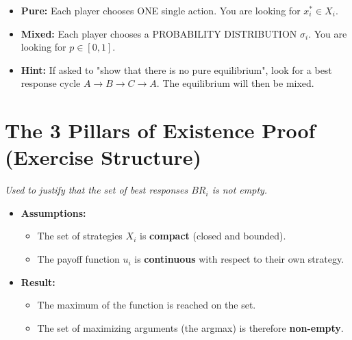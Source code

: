 \documentclass[10pt,a4paper]{article}
\begin{document}
\begin{tcolorbox}[colback=purple!5,title=Distinction: Pure vs Mixed Equilibrium]
\begin{itemize}
    \item \textbf{Pure:} Each player chooses ONE single action. You are looking for $x_i^* \in X_i$.
    \item \textbf{Mixed:} Each player chooses a PROBABILITY DISTRIBUTION $\sigma_i$. You are looking for $p \in [0,1]$.
    \item \textbf{Hint:} If asked to "show that there is no pure equilibrium", look for a best response cycle $A \to B \to C \to A$. The equilibrium will then be mixed.
\end{itemize}
\end{tcolorbox}

\section{The 3 Pillars of Existence Proof (Exercise Structure)}

\begin{tcolorbox}[colback=white, title=\textbf{1. Weierstrass Theorem (Extremum)}]
\textit{Used to justify that the set of best responses $BR_i$ is not empty.}
\begin{itemize}
    \item \textbf{Assumptions:}
    \begin{itemize}
        \item The set of strategies $X_i$ is \textbf{compact} (closed and bounded).
        \item The payoff function $u_i$ is \textbf{continuous} with respect to their own strategy.
    \end{itemize}
    \item \textbf{Result:}
    \begin{itemize}
        \item The maximum of the function is reached on the set.
        \item The set of maximizing arguments (the argmax) is therefore \textbf{non-empty}.
    \end{itemize}
\end{itemize}
\end{tcolorbox}
\end{document}
